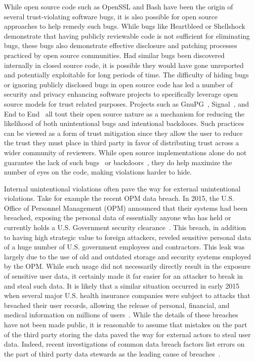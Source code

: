 While open source code such as OpenSSL and Bash have been the origin
of several trust-violating software bugs, it is also possible for open
source approaches to help remedy such bugs. While bugs like Heartbleed
or Shellshock demonstrate that having publicly reviewable code is not
sufficient for eliminating bugs, these bugs also demonstrate effective
disclosure and patching processes practiced by open source
communities. Had similar bugs been discovered internally in closed
source code, it is possible they would have gone unreported and
potentially exploitable for long periods of time. The difficulty of
hiding bugs or ignoring publicly disclosed bugs in open source code
has led a number of security and privacy enhancing software projects
to specifically leverage open source models for trust related
purposes. Projects such as GnuPG~\cite{gnupg},
Signal~\cite{openwhisper}, and End to End~\cite{google-endtoend,
  yahoo-endtoend} all tout their open source nature as a mechanism for
reducing the likelihood of both unintentional bugs and intentional
backdoors. Such practices can be viewed as a form of trust mitigation
since they allow the user to reduce the trust they must place in third
party in favor of distributing trust across a wider community of
reviewers. While open source implementations alone do not guarantee
the lack of such bugs~\cite{frosch2014} or
backdoors~\cite{thompson1984}, they do help maximize the number of
eyes on the code, making violations harder to hide.

Internal unintentional violations often pave the way for external
unintentional violations. Take for example the recent OPM data
breach. In 2015, the U.S. Office of Personnel Management (OPM)
announced that their systems had been breached, exposing the personal
data of essentially anyone who has held or currently holds a
U.S. Government security clearance~\cite{ars-opmhack,
  opm-cybersecurityincidents}. This breach, in addition to having high
strategic value to foreign attackers, reveled sensitive personal data
of a huge number of U.S. government employees and contractors. This
leak was largely due to the use of old and outdated storage and
security systems employed by the OPM. While such usage did not
necessarily directly result in the exposure of sensitive user data, it
certainly made it far easier for an attacker to break in and steal
such data. It is likely that a similar situation occurred in early
2015 when several major U.S. health insurance companies were subject
to attacks that breached their user records, allowing the release of
personal, financial, and medical information on millions of
users~\cite{krebs-anthem, krebs-premera}. While the details of these
breaches have not been made public, it is reasonable to assume that
mistakes on the part of the third party storing the data paved the way
for external actors to steal user data. Indeed, recent investigations
of common data breach factors list errors on the part of third party
data stewards as the leading cause of breaches~\cite{gallagher-blame,
  verizon-2016breach}.


